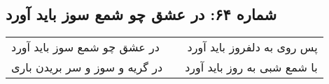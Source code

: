 \begin{center}
\section*{شماره ۶۴: در عشق چو شمع سوز باید آورد}
\label{sec:064}
\begin{longtable}{l p{0.5cm} r}
در عشق چو شمع سوز باید آورد
&&
پس روی به دلفروز باید آورد
\\
در گریه و سوز و سر بریدن باری
&&
با شمع شبی به روز باید آورد
\\
\end{longtable}
\end{center}
